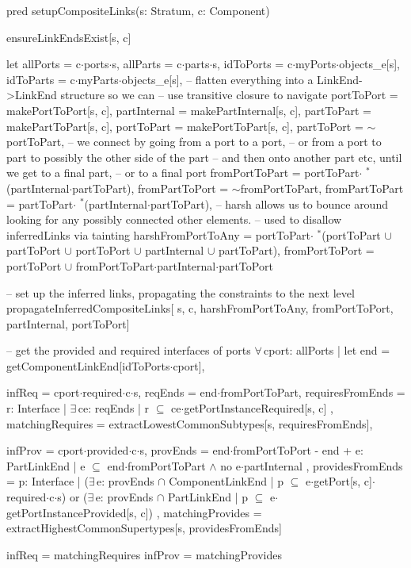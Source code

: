 pred setupCompositeLinks(s: Stratum, c: Component)
{
  ensureLinkEndsExist[s, c]

  let
    allPorts = c$\cdot$ports$\cdot$s,
    allParts = c$\cdot$parts$\cdot$s,
    idToPorts = c$\cdot$myPorts$\cdot$objects_e[s],
    idToParts = c$\cdot$myParts$\cdot$objects_e[s],
    -- flatten everything into a LinkEnd->LinkEnd structure so we can
    -- use transitive closure to navigate
    portToPort =   makePortToPort[s, c],
    partInternal = makePartInternal[s, c],
    partToPart =   makePartToPart[s, c],
    portToPart =   makePortToPart[s, c],
    partToPort =    $\sim$portToPart,
    -- we connect by going from a port to a port,
    -- or from a port to part to possibly the other side of the part
    -- and then onto another part etc, until we get to a final part,
    -- or to a final port
    fromPortToPart = portToPart$\cdot$ $\!\!\!^\ast\!$(partInternal$\cdot$partToPart),
    fromPartToPort =  $\sim$fromPortToPart,
    fromPartToPart = partToPart$\cdot$ $\!\!\!^\ast\!$(partInternal$\cdot$partToPart),
    -- harsh allows us to bounce around looking for any possibly connected other elements.
    -- used to disallow inferredLinks via tainting
    harshFromPortToAny =
      portToPart$\cdot$ $\!\!\!^\ast\!$(portToPart $\cup$ partToPort $\cup$ portToPort $\cup$ partInternal $\cup$ partToPart),
    fromPortToPort = portToPort $\cup$ fromPortToPart$\cdot$partInternal$\cdot$partToPort
  {
    -- set up the inferred links, propagating the constraints to the next level
    propagateInferredCompositeLinks[
      s, c, harshFromPortToAny, fromPortToPort,
      partInternal, portToPort]

    -- get the provided and required interfaces of ports
    $\forall\,$cport: allPorts |
    let
      end = getComponentLinkEnd[idToPorts$\cdot$cport],
      
      infReq = cport$\cdot$required$\cdot$c$\cdot$s,
      reqEnds = end$\cdot$fromPortToPart,
      requiresFromEnds =
        { r: Interface  |
          $\exists\,$ce: reqEnds |
            r $\subseteq$ ce$\cdot$getPortInstanceRequired[s, c] },
    matchingRequires = extractLowestCommonSubtypes[s, requiresFromEnds],
      
      infProv = cport$\cdot$provided$\cdot$c$\cdot$s,
      provEnds = end$\cdot$fromPortToPort - end +
        { e: PartLinkEnd |
          e $\subseteq$ end$\cdot$fromPortToPart $\wedge$ no e$\cdot$partInternal
        },
      providesFromEnds =
        { p: Interface |
          {
            ($\exists\,$e: provEnds $\cap$ ComponentLinkEnd |
              p $\subseteq$ e$\cdot$getPort[s, c]$\cdot$required$\cdot$c$\cdot$s)
            or
            ($\exists\,$e: provEnds $\cap$ PartLinkEnd |
              p $\subseteq$ e$\cdot$getPortInstanceProvided[s, c])
          }
        },
    matchingProvides = extractHighestCommonSupertypes[s, providesFromEnds]
    {
      infReq = matchingRequires
      infProv = matchingProvides

}}}
